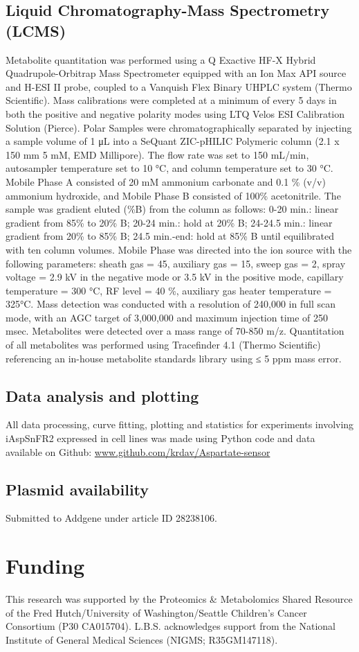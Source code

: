 \documentclass[9pt,lineno]{elife}
\begin{document}
\subsection{Liquid Chromatography-Mass Spectrometry (LCMS)}
Metabolite quantitation was performed using a Q Exactive HF-X Hybrid Quadrupole-Orbitrap Mass Spectrometer equipped with an Ion Max API source and H-ESI II probe, coupled to a Vanquish Flex Binary UHPLC system (Thermo Scientific).
Mass calibrations were completed at a minimum of every 5 days in both the positive and negative polarity modes using LTQ Velos ESI Calibration Solution (Pierce).
Polar Samples were chromatographically separated by injecting a sample volume of 1 μL into a SeQuant ZIC-pHILIC Polymeric column (2.1 x 150 mm 5 mM, EMD Millipore).
The flow rate was set to 150 mL/min, autosampler temperature set to 10 °C, and column temperature set to 30 °C.
Mobile Phase A consisted of 20 mM ammonium carbonate and 0.1 \% (v/v) ammonium hydroxide, and Mobile Phase B consisted of 100\% acetonitrile.
The sample was gradient eluted (\%B) from the column as follows: 0-20 min.: linear gradient from 85\% to 20\% B; 20-24 min.: hold at 20\% B; 24-24.5 min.: linear gradient from 20\% to 85\% B; 24.5 min.-end: hold at 85\% B until equilibrated with ten column volumes.
Mobile Phase was directed into the ion source with the following parameters: sheath gas = 45, auxiliary gas = 15, sweep gas = 2, spray voltage = 2.9 kV in the negative mode or 3.5 kV in the positive mode, capillary temperature = 300 °C, RF level = 40 \%, auxiliary gas heater temperature = 325°C.
Mass detection was conducted with a resolution of 240,000 in full scan mode, with an AGC target of 3,000,000 and maximum injection time of 250 msec.
Metabolites were detected over a mass range of 70-850 m/z.
Quantitation of all metabolites was performed using Tracefinder 4.1 (Thermo Scientific) referencing an in-house metabolite standards library using ≤ 5 ppm mass error.

\subsection{Data analysis and plotting}
All data processing, curve fitting, plotting and statistics for experiments involving iAspSnFR2 expressed in cell lines was made using Python code and data available on Github:
\url{www.github.com/krdav/Aspartate-sensor}

\subsection{Plasmid availability}
Submitted to Addgene under article ID 28238106.

\section{Funding}
This research was supported by the Proteomics \& Metabolomics Shared Resource of the Fred Hutch/University of Washington/Seattle Children’s Cancer Consortium (P30 CA015704).
L.B.S. acknowledges support from the National Institute of General Medical Sciences (NIGMS; R35GM147118).




\end{document}
